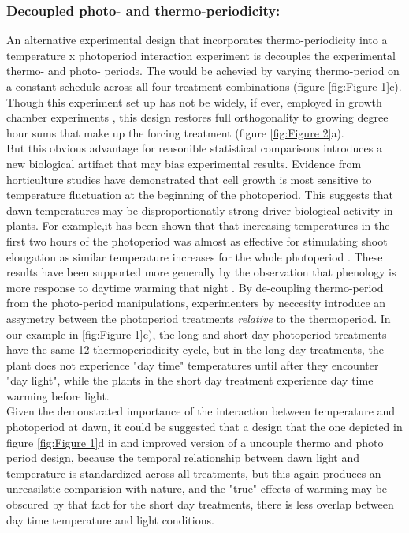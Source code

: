 \documentclass[12pt]{article}\usepackage[]{graphicx}\usepackage[]{color}
\begin{document}
\subsubsection*{Decoupled photo- and thermo-periodicity:}
 \indent \indent An alternative experimental design that incorporates thermo-periodicity into a temperature x photoperiod interaction experiment is decouples the experimental thermo- and photo- periods. The would be achevied by varying thermo-period on a constant schedule across all four treatment combinations (figure \ref{fig:Figure 1}c). Though this experiment set up has not be widely, if ever, employed in growth chamber experiments \citep{Ettinger_inprep}, this design restores full orthogonality to growing degree hour sums that make up the forcing treatment (figure \ref{fig:Figure 2}a).\\
\indent But this obvious advantage for reasonible statistical comparisons introduces a new biological artifact that may bias experimental results. Evidence from horticulture studies have demonstrated that cell growth is most sensitive to temperature fluctuation at the beginning of the photoperiod\citep{Erwin1998}. This suggests that dawn temperatures may be disproportionatly strong driver biological activity in plants. For example,it has been shown that that increasing temperatures in the first two hours of the photoperiod was almost as effective for stimulating shoot elongation as similar temperature increases for the whole photoperiod \citep{Erwin1998}. These results have been supported more generally by the observation that phenology is more response to daytime warming that night \citep{Rossi2017}. By de-coupling thermo-period from the photo-period manipulations, experimenters by neccesity introduce an assymetry between the photoperiod treatments \textit{relative} to the thermoperiod. In our example in \ref{fig:Figure 1}c), the long and short day photoperiod treatments have the same 12 thermoperiodicity cycle, but in the long day treatments, the plant does not experience "day time" temperatures until after they encounter "day light", while the plants in the short day treatment experience day time warming before light.\\
\indent Given the demonstrated importance of the interaction between temperature and photoperiod at dawn, it could be suggested that a design that the one depicted in figure \ref{fig:Figure 1}d in and improved version of a uncouple thermo and photo period design, because the temporal relationship between dawn light and temperature is standardized across all treatments, but this again produces an unreasilstic comparision with nature, and the "true" effects of warming may be obscured by that fact for the short day treatments, there is less overlap between day time temperature and light conditions.\\ %
\end{document}
